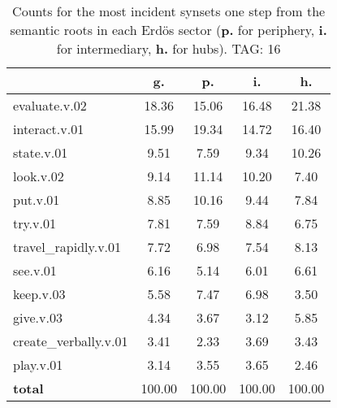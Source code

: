 \begin{table}[h!]
\begin{center}
\begin{tabular}{| l || c | c | c | c |}\hline
 & {\bf g.} & {\bf p.} & {\bf i.} & {\bf h.} \\\hline\hline
evaluate.v.02 & 18.36  & 15.06  & 16.48  & 21.38 \\\hline
interact.v.01 & 15.99  & 19.34  & 14.72  & 16.40 \\\hline
state.v.01 & 9.51  & 7.59  & 9.34  & 10.26 \\\hline
look.v.02 & 9.14  & 11.14  & 10.20  & 7.40 \\\hline
put.v.01 & 8.85  & 10.16  & 9.44  & 7.84 \\\hline
try.v.01 & 7.81  & 7.59  & 8.84  & 6.75 \\\hline
travel\_rapidly.v.01 & 7.72  & 6.98  & 7.54  & 8.13 \\\hline
see.v.01 & 6.16  & 5.14  & 6.01  & 6.61 \\\hline
keep.v.03 & 5.58  & 7.47  & 6.98  & 3.50 \\\hline
give.v.03 & 4.34  & 3.67  & 3.12  & 5.85 \\\hline
create\_verbally.v.01 & 3.41  & 2.33  & 3.69  & 3.43 \\\hline
play.v.01 & 3.14  & 3.55  & 3.65  & 2.46 \\\hline\hline
{{\bf total}} & 100.00  & 100.00  & 100.00  & 100.00 \\\hline
\end{tabular}
\caption{Counts for the most incident synsets one step from the semantic roots in each Erd\"os sector ({\bf p.} for periphery, {\bf i.} for intermediary, {\bf h.} for hubs). TAG: 16}
\end{center}
\end{table}